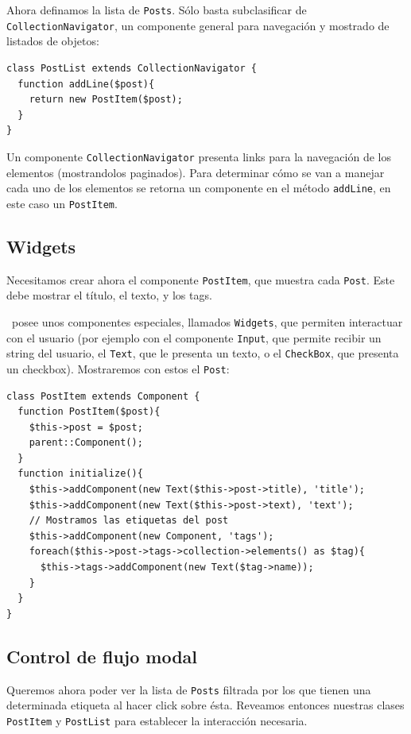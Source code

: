 Ahora definamos la lista de \verb"Posts". Sólo basta subclasificar de \verb"CollectionNavigator", un componente general para navegación y mostrado de listados de objetos:

\begin{verbatim}
class PostList extends CollectionNavigator {
  function addLine($post){
    return new PostItem($post);
  }
}

\end{verbatim}

Un componente \verb"CollectionNavigator" presenta links para la navegación de los elementos (mostrandolos paginados). Para determinar cómo se van a manejar cada uno de los elementos se retorna un componente en el método \verb"addLine", en este caso un \verb'PostItem'.


\subsection{Widgets}
\label{sub-widget}

Necesitamos crear ahora el componente \verb'PostItem', que muestra cada \verb'Post'. Este debe mostrar el título, el texto, y los tags.

\PWB\ posee unos componentes especiales, llamados \verb"Widgets"\cite{WDGTS}, que permiten interactuar con el usuario (por ejemplo con el componente \verb"Input", que permite recibir un string del usuario, el \verb"Text", que le presenta un texto, o el \verb"CheckBox", que presenta un checkbox). Mostraremos con estos el \verb'Post':

\begin{verbatim}
class PostItem extends Component {
  function PostItem($post){
    $this->post = $post;
    parent::Component();
  }
  function initialize(){
    $this->addComponent(new Text($this->post->title), 'title');
    $this->addComponent(new Text($this->post->text), 'text');
    // Mostramos las etiquetas del post
    $this->addComponent(new Component, 'tags');
    foreach($this->post->tags->collection->elements() as $tag){
      $this->tags->addComponent(new Text($tag->name));
    }
  }
}
\end{verbatim}

\subsection{Control de flujo modal}
\label{sub-modal-flow}
Queremos ahora poder ver la lista de \verb"Posts" filtrada por los que tienen una determinada etiqueta al hacer click sobre ésta. Reveamos entonces nuestras clases \verb"PostItem" y \verb"PostList" para establecer la interacción necesaria.


